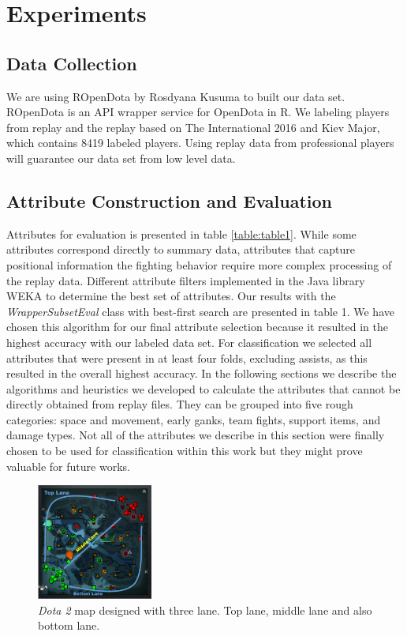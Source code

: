 \section{Experiments}
\label{sec:exp}

\subsection{Data Collection}
\label{sec:datacollection}

We are using ROpenDota by Rosdyana Kusuma to built our data set. ROpenDota is an API wrapper service for OpenDota in R. We labeling players from replay and the replay based on The International 2016 and Kiev Major, which contains 8419 labeled players. Using replay data from professional players will guarantee our data set from low level data.

\subsection{Attribute Construction and Evaluation}
\label{sec:attconsandeval}

Attributes for evaluation is presented in table \ref{table:table1}. While some attributes correspond directly to summary data, attributes that capture positional information the fighting behavior require more complex processing of the replay data. Different attribute filters implemented in the Java library WEKA \cite{hall2009weka} to determine the best set of attributes. Our results with the \textit{WrapperSubsetEval} class with best-first search are presented in table 1. We have chosen this algorithm for our final attribute selection because it resulted in the highest accuracy with our labeled data set. For classification we selected all attributes that were present in at least four folds, excluding assists, as this resulted in the overall highest accuracy. In the following sections we describe the algorithms and heuristics we developed to calculate the attributes that cannot be directly obtained from replay files. They can be grouped into five rough categories: space and movement, early ganks, team fights, support items, and damage types. Not all of the attributes we describe in this section were finally chosen to be used for classification within this work but they might prove valuable for future works.

\begin{figure}
\centering
\includegraphics[width=1.5in]{./figures/lane_map.png}
\caption{\textit{Dota 2} map designed with three lane. Top lane, middle lane and also bottom lane.}
\label{fig:map_lane}
\end{figure}

